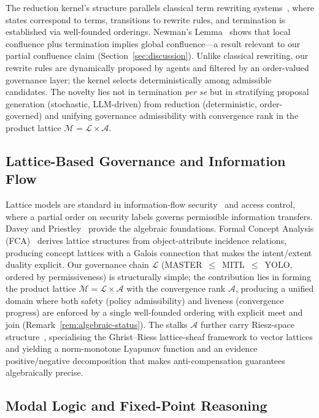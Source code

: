 \documentclass[11pt]{article}
\begin{document}
The reduction kernel's structure parallels classical term rewriting systems~\cite{baader1998}, where states correspond to terms, transitions to rewrite rules, and termination is established via well-founded orderings. Newman's Lemma~\cite{newman1942} shows that local confluence plus termination implies global confluence---a result relevant to our partial confluence claim (Section~\ref{sec:discussion}). Unlike classical rewriting, our rewrite rules are dynamically proposed by agents and filtered by an order-valued governance layer; the kernel selects deterministically among admissible candidates. The novelty lies not in termination \emph{per se} but in stratifying proposal generation (stochastic, LLM-driven) from reduction (deterministic, order-governed) and unifying governance admissibility with convergence rank in the product lattice $\mathcal{M} = \mathcal{L} \times \mathcal{A}$.

\subsection{Lattice-Based Governance and Information Flow}

Lattice models are standard in information-flow security~\cite{denning1976,bell1973} and access control, where a partial order on security labels governs permissible information transfers. Davey and Priestley~\cite{davey2002} provide the algebraic foundations. Formal Concept Analysis (FCA)~\cite{ganter1999,wille1982} derives lattice structures from object-attribute incidence relations, producing concept lattices with a Galois connection that makes the intent/extent duality explicit. Our governance chain $\mathcal{L}$ (MASTER~$\leq$~MITL~$\leq$~YOLO, ordered by permissiveness) is structurally simple; the contribution lies in forming the product lattice $\mathcal{M} = \mathcal{L} \times \mathcal{A}$ with the convergence rank $\mathcal{A}$, producing a unified domain where both safety (policy admissibility) and liveness (convergence progress) are enforced by a single well-founded ordering with explicit meet and join (Remark~\ref{rem:algebraic-status}). The stalks $\mathcal{A}$ further carry Riesz-space structure~\cite{ghrist2022}, specialising the Ghrist--Riess lattice-sheaf framework to vector lattices and yielding a norm-monotone Lyapunov function and an evidence positive/negative decomposition that makes anti-compensation guarantees algebraically precise.

\subsection{Modal Logic and Fixed-Point Reasoning}
\end{document}
